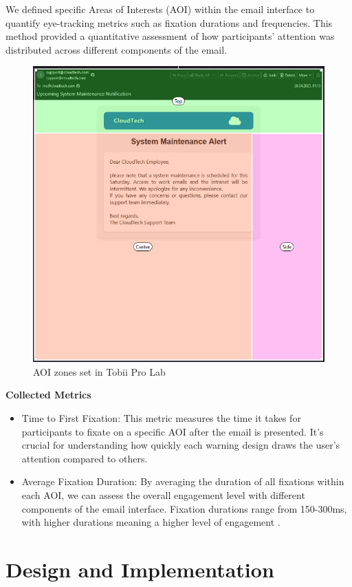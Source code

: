 \documentclass[
  a4paper,  %
  twoside,  %
  bibliography=totoc,
  headsepline,
  cleardoublepage=empty,
  parskip=half,
  draft=false
]{scrbook}
\begin{document}
We defined specific Areas of Interests (AOI) within the email interface to quantify eye-tracking metrics such as fixation durations and frequencies. This method provided a quantitative assessment of how participants' attention was distributed across different components of the email. 

\begin{figure} [ht]
    \centering
    \includegraphics[width=0.8\linewidth]{figures/aoi.png}
    \caption{AOI zones set in Tobii Pro Lab}
    \label{fig:aoi}
\end{figure}

\textbf{Collected Metrics}

\begin{itemize}
    \item Time to First Fixation: This metric measures the time it takes for participants to fixate on a specific AOI after the email is presented. It's crucial for understanding how quickly each warning design draws the user's attention compared to others.
    \item Average Fixation Duration: By averaging the duration of all fixations within each AOI, we can assess the overall engagement level with different components of the email interface. Fixation durations range from 150-300ms, with higher durations meaning a higher level of engagement \cite{eyetrack}.
\end{itemize}

\chapter{Design and Implementation}
\label{implementation}
\end{document}
